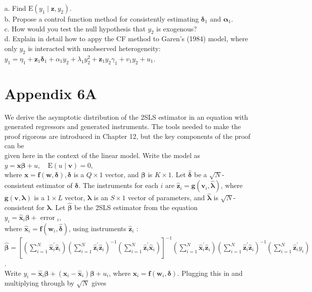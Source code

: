\documentclass[10pt]{article}
\begin{document}
a. Find $\mathrm{E}\left(y_{1} \mid \mathbf{z}, y_{2}\right)$.\\
b. Propose a control function method for consistently estimating $\boldsymbol{\delta}_{1}$ and $\boldsymbol{\alpha}_{1}$.\\
c. How would you test the null hypothesis that $y_{2}$ is exogenous?\\
d. Explain in detail how to appy the CF method to Garen's (1984) model, where only $y_{2}$ is interacted with unobserved heterogeneity: $y_{1}=\eta_{1}+\mathbf{z}_{1} \boldsymbol{\delta}_{1}+\alpha_{1} y_{2}+\lambda_{1} y_{2}^{2}+ \mathbf{z}_{1} y_{2} \gamma_{1}+v_{1} y_{2}+u_{1}$.

\section*{Appendix 6A}
We derive the asymptotic distribution of the 2SLS estimator in an equation with generated regressors and generated instruments. The tools needed to make the proof rigorous are introduced in Chapter 12, but the key components of the proof can be\\
given here in the context of the linear model. Write the model as\\
$y=\mathbf{x} \boldsymbol{\beta}+u, \quad \mathrm{E}(u \mid \mathbf{v})=0$,\\
where $\mathbf{x}=\mathbf{f}(\mathbf{w}, \boldsymbol{\delta}), \boldsymbol{\delta}$ is a $Q \times 1$ vector, and $\boldsymbol{\beta}$ is $K \times 1$. Let $\hat{\boldsymbol{\delta}}$ be a $\sqrt{N}$-consistent estimator of $\boldsymbol{\delta}$. The instruments for each $i$ are $\hat{\mathbf{z}}_{i}=\mathbf{g}\left(\mathbf{v}_{i}, \hat{\boldsymbol{\lambda}}\right)$, where $\mathbf{g}(\mathbf{v}, \boldsymbol{\lambda})$ is a $1 \times L$ vector, $\boldsymbol{\lambda}$ is an $S \times 1$ vector of parameters, and $\hat{\boldsymbol{\lambda}}$ is $\sqrt{N}$-consistent for $\boldsymbol{\lambda}$. Let $\hat{\boldsymbol{\beta}}$ be the 2SLS estimator from the equation\\
$y_{i}=\hat{\mathbf{x}}_{i} \boldsymbol{\beta}+$ error $_{i}$,\\
where $\hat{\mathbf{x}}_{i}=\mathbf{f}\left(\mathbf{w}_{i}, \hat{\boldsymbol{\delta}}\right)$, using instruments $\hat{\mathbf{z}}_{i}$ :\\
$\hat{\boldsymbol{\beta}}=\left[\left(\sum_{i=1}^{N} \hat{\mathbf{x}}_{i}^{\prime} \hat{\mathbf{z}}_{i}\right)\left(\sum_{i=1}^{N} \hat{\mathbf{z}}_{i}^{\prime} \hat{\mathbf{z}}_{i}\right)^{-1}\left(\sum_{i=1}^{N} \hat{\mathbf{z}}_{i}^{\prime} \hat{\mathbf{x}}_{i}\right)\right]^{-1}\left(\sum_{i=1}^{N} \hat{\mathbf{x}}_{i}^{\prime} \hat{\mathbf{z}}_{i}\right)\left(\sum_{i=1}^{N} \hat{\mathbf{z}}_{i}^{\prime} \hat{\mathbf{z}}_{i}\right)^{-1}\left(\sum_{i=1}^{N} \hat{\mathbf{z}}_{i}^{\prime} y_{i}\right)$.\\
Write $y_{i}=\hat{\mathbf{x}}_{i} \boldsymbol{\beta}+\left(\mathbf{x}_{i}-\hat{\mathbf{x}}_{i}\right) \boldsymbol{\beta}+u_{i}$, where $\mathbf{x}_{i}=\mathbf{f}\left(\mathbf{w}_{i}, \boldsymbol{\delta}\right)$. Plugging this in and multiplying through by $\sqrt{N}$ gives
\end{document}
